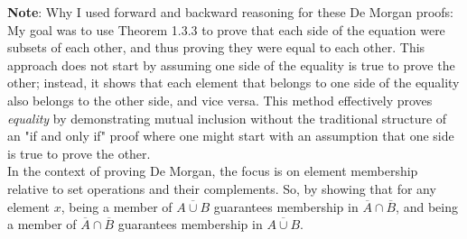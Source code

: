 
\newpage

    \textbf{Note}: Why I used forward and backward reasoning for these De Morgan proofs: \\

    My goal was to use Theorem 1.3.3 to prove that each side of the equation were subsets of each other, and thus proving they were equal to each other. This approach does not start by assuming one side of the equality is true to prove the other; instead, it shows that each element that belongs to one side of the equality also belongs to the other side, and vice versa. This method effectively proves \textit{equality} by demonstrating mutual inclusion without the traditional structure of an "if and only if" proof where one might start with an assumption that one side is true to prove the other. \\

    In the context of proving De Morgan, the focus is on element membership relative to set operations and their complements. So, by showing that for any element $x$, being a member of $\overline{A\cup B}$ guarantees membership in $\overline{A} \cap \overline{B}$, and being a member of $\overline{A} \cap \overline{B}$ guarantees membership in $\overline{A\cup B}$. \\

